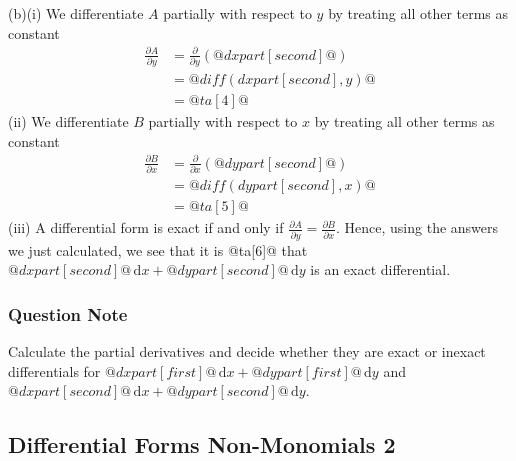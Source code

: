 \documentclass[a4paper,10pt]{article}
\begin{document}
(b)(i) We differentiate $A$ partially with respect to $y$ by treating all other terms as constant \begin{align*} \frac{\partial A}{\partial y} &= \frac{\partial}{\partial y} \left( @dxpart[second]@ \right) \\ &= @diff(dxpart[second],y)@  \\ &= @ta[4]@ \end{align*}(ii) We differentiate $B$ partially with respect to $x$ by treating all other terms as constant \begin{align*} \frac{\partial B}{\partial x} &= \frac{\partial}{\partial x} \left( @dypart[second]@ \right) \\ &= @diff(dypart[second],x)@   \\ &= @ta[5]@ \end{align*}(iii) A differential form is exact if and only if $\frac{\partial A}{\partial y} = \frac{\partial B}{\partial x}$. Hence, using the answers we just calculated, we see that it is @ta[6]@ that $@dxpart[second]@ \, \text{d}x + @dypart[second]@ \, \text{d}y$ is an exact differential.
\subsubsection{Question Note}
Calculate the partial derivatives and decide whether they are exact or inexact differentials for $@dxpart[first]@ \, \text{d}x + @dypart[first]@ \, \text{d}y$  and $@dxpart[second]@ \, \text{d}x + @dypart[second]@ \, \text{d}y$.

\subsection{Differential Forms Non-Monomials 2}
\end{document}
